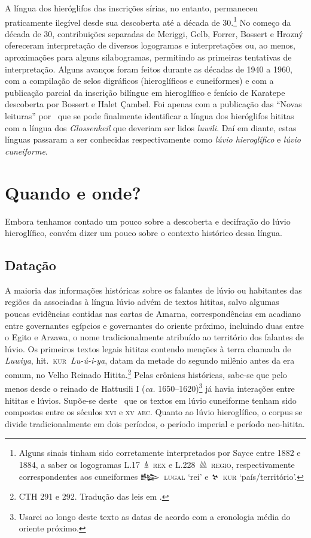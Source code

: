 A língua dos hieróglifos das inscrições sírias, no entanto, permaneceu
praticamente ilegível desde sua descoberta até a década de 30.\footnote{Alguns
	sinais tinham sido corretamente interpretados por Sayce entre 1882 e 1884, a
	saber os logogramas \mbox{L.17 𔐑 \textsc{rex}} e \mbox{L.228 𔔆 \textsc{regio}},
	respectivamente correspondentes aos cuneiformes
	\mbox{\foreignlanguage{hittite}{𒈗} \textsc{lugal}} `rei' e \mbox{\foreignlanguage{hittite}{𒆳} \textsc{kur}}
	`país\slash{}território'.}
No começo da década de 30, contribuições separadas de Meriggi, Gelb, Forrer,
Bossert e Hrozný ofereceram interpretação de diversos logogramas e
interpretações ou, ao menos, aproximações para alguns silabogramas,
permitindo as primeiras tentativas de interpretação.
Alguns avanços foram feitos durante as décadas de 1940 a 1960, com a compilação
de selos digráficos (hieroglíficos e cuneiformes) e com a publicação parcial da
inscrição bilíngue em hieroglífico e fenício de Karatepe descoberta por
Bossert e Halet Çambel.
Foi apenas com a publicação das ``Novas leituras''
por~\textcite{HawkinsMorpurgoNeumann1974} que se pode finalmente identificar a
língua dos hieróglifos hititas com a língua dos
\emph{\foreignlanguage{german}{Glossenkeil}} que deveriam
ser lidos \emph{luwili}.
Daí em diante, estas línguas passaram a ser conhecidas respectivamente como
\emph{lúvio hieroglífico} e \emph{lúvio cuneiforme}.

\section{Quando e onde?}

Embora tenhamos contado um pouco sobre a descoberta e decifração do lúvio
hieroglífico, convém dizer um pouco sobre o contexto histórico dessa língua.

\subsection{Datação}
A maioria das informações históricas sobre os falantes de lúvio ou habitantes
das regiões da associadas à língua lúvio advém de textos hititas, salvo algumas
poucas evidências contidas nas cartas de Amarna, correspondências em acadiano
entre governantes egípcios e governantes do oriente próximo, incluindo duas
entre o Egito e Arzawa, o nome tradicionalmente atribuído ao território dos
falantes de lúvio.
Os primeiros textos legais hititas contendo menções à
terra chamada de \emph{Luwiya}, hit.\ \mbox{\textsc{kur} \textit{Lu-ú-i-ya}},
datam da metade do segundo milênio antes da era comum, no Velho Reinado
Hitita.\footnote{CTH 291 e 292. Tradução das leis em \textcite{Hoffner1997}.}
Pelas crônicas históricas, sabe-se que pelo menos desde o reinado de Hattusili I
(\emph{ca.} 1650--1620)\footnote{Usarei ao longo deste texto as datas de acordo
	com a cronologia média do oriente próximo.} já havia interações entre hititas
e lúvios.
Supõe-se deste~\textcite{Starke1985} que os textos em lúvio cuneiforme tenham
sido compostos entre os séculos \textsc{xvi} e \textsc{xv} \textsc{aec}.
Quanto ao lúvio hieroglífico, o corpus se divide tradicionalmente em dois
períodos, o período imperial e período neo\hyp{}hitita.

